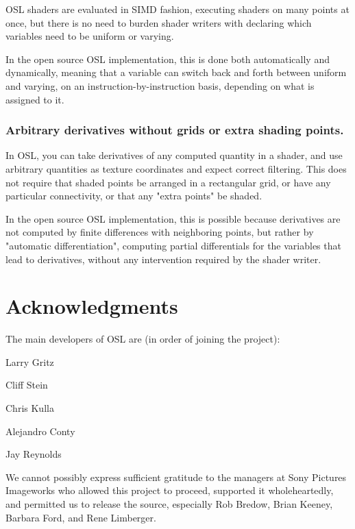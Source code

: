 \documentclass[11pt,letterpaper]{book}
\begin{document}
  OSL shaders are evaluated in SIMD fashion, executing shaders on many
  points at once, but there is no need to burden shader writers with
  declaring which variables need to be uniform or varying.  

  In the open source OSL implementation, this is done both automatically
  and dynamically, meaning that a variable can switch back and forth
  between uniform and varying, on an instruction-by-instruction basis,
  depending on what is assigned to it.

\subsubsection*{Arbitrary derivatives without grids or extra shading points.}

  In OSL, you can take derivatives of any computed quantity in a shader,
  and use arbitrary quantities as texture coordinates and expect correct
  filtering.  This does not require that shaded points be arranged in a
  rectangular grid, or have any particular connectivity, or that any
  "extra points" be shaded.  

  In the open source OSL implementation, this is possible because
  derivatives are not computed by finite differences with neighboring
  points, but rather by "automatic differentiation", computing partial
  differentials for the variables that lead to derivatives, without any
  intervention required by the shader writer.


\vspace{0.5in}


\section*{Acknowledgments}

The main developers of OSL are (in order of joining the project):

\vspace*{0.2in}

    Larry Gritz

    Cliff Stein

    Chris Kulla

    Alejandro Conty

    Jay Reynolds

\vspace*{0.2in}

We cannot possibly express sufficient gratitude to the managers at Sony
Pictures Imageworks who allowed this project to proceed, supported it
wholeheartedly, and permitted us to release the source, especially Rob
Bredow, Brian Keeney, Barbara Ford, and Rene Limberger.
\end{document}
